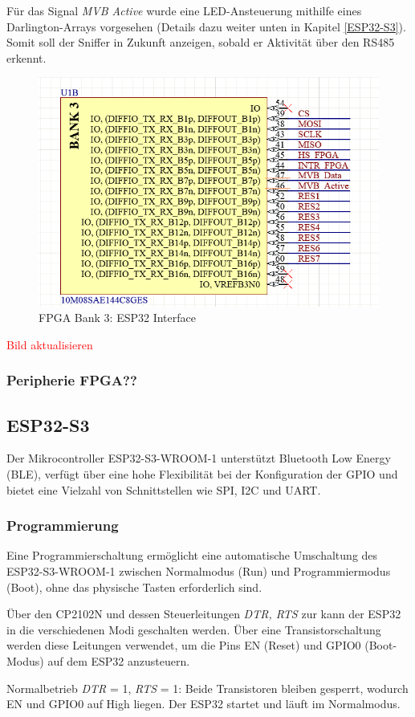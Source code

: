 Für das Signal \textit{MVB Active} wurde eine LED-Ansteuerung mithilfe eines Darlington-Arrays vorgesehen (Details dazu weiter unten in Kapitel \ref{ESP32-S3}). Somit soll der Sniffer in Zukunft anzeigen, sobald er Aktivität über den RS485 erkennt.

\begin{figure}[H]
    \centering
    \includegraphics[width=0.6\linewidth]{Figures/Chap3/Schematics/Bank3_ESP.png}
    \caption{FPGA Bank 3: ESP32 Interface}
    \label{FPGA ESP}
\end{figure}
\textcolor{red}{Bild aktualisieren}

\subsubsection{Peripherie FPGA??}


\subsection{ESP32-S3}
Der Mikrocontroller ESP32-S3-WROOM-1 unterstützt Bluetooth Low Energy (BLE), verfügt über eine hohe Flexibilität bei der Konfiguration der GPIO und bietet eine Vielzahl von Schnittstellen wie SPI, I2C und UART.

\subsubsection{Programmierung}
Eine Programmierschaltung ermöglicht eine automatische Umschaltung des ESP32-S3-WROOM-1 zwischen Normalmodus (Run) und Programmiermodus (Boot), ohne das physische Tasten erforderlich sind. 

Über den CP2102N und dessen Steuerleitungen \textit{DTR, RTS} zur kann der ESP32 in die verschiedenen Modi geschalten werden. Über eine Transistorschaltung werden diese Leitungen verwendet, um die Pins EN (Reset) und GPIO0 (Boot-Modus) auf dem ESP32 anzusteuern.

Normalbetrieb
\textit{DTR} = 1, \textit{RTS} = 1: Beide Transistoren bleiben gesperrt, wodurch EN und GPIO0 auf High liegen. Der ESP32 startet und läuft im Normalmodus.

